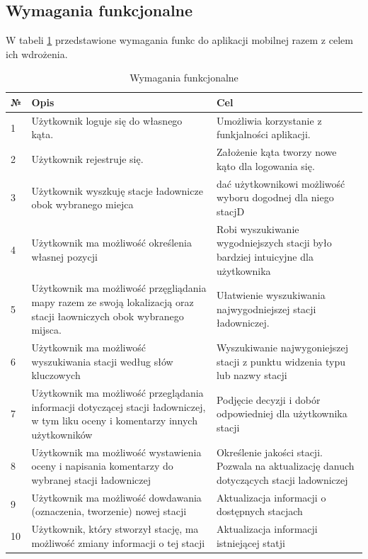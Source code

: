 \subsection{Wymagania funkcjonalne}
W tabeli \ref{tab:wymaganiafunkcjonalne} przedstawione wymagania funkc do aplikacji mobilnej razem z celem ich wdrożenia.
\begin{table}[htb] \small
    \caption{Wymagania funkcjonalne}
    \label{tab:wymaganiafunkcjonalne}
    \begin{tabular}{| m{0.5cm} | m{7cm} | m{7cm} |} 
    \hline
    № & Opis & Cel \\
    \hline
    1 & Użytkownik loguje się do własnego kąta. & Umożliwia korzystanie z funkjalności aplikacji. \\ 
    \hline
    2 & Użytkownik rejestruje się. & Założenie kąta tworzy nowe kąto dla logowania się. \\ 
    \hline
    3 & Użytkownik wyszkuję stacje ładownicze obok wybranego miejca  & dać użytkownikowi możliwość wyboru dogodnej dla niego stacjD \\
    \hline
    4 & Użytkownik ma możliwość określenia własnej pozycji & Robi wyszukiwanie wygodniejszych stacji było bardziej intuicyjne dla użytkownika  \\
    \hline
    5 & Użytkownik ma możliwość przęgliądania mapy razem ze swoją lokalizacją oraz stacji łaowniczych obok wybranego mijsca. & Ułatwienie wyszukiwania najwygodniejszej stacji ładowniczej. \\
    \hline
    6 & Użytkownik ma możliwość wyszukiwania stacji według słów kluczowych & Wyszukiwanie najwygoniejszej stacji z punktu widzenia typu lub nazwy stacji \\
    \hline
    7 & Użytkownik ma możliwość przeglądania informacji dotyczącej stacji ładowniczej, w tym liku oceny i komentarzy innych użytkowników & Podjęcie decyzji i dobór odpowiedniej dla użytkownika stacji \\
    \hline
    8 & Użytkownik ma możliwość wystawienia oceny i napisania komentarzy do wybranej stacji ładowniczej & Określenie jakości stacji. Pozwala na aktualizację danuch dotyczących stacji ladowniczej \\
    \hline
    9 & Użytkownik ma możliwość dowdawania (oznaczenia, tworzenie) nowej stacji & Aktualizacja informacji o dostępnych stacjach \\
    \hline
    10 & Użytkownik, który stworzył stację, ma możliwość zmiany informacji o tej stacji & Aktualizacja informacji istniejącej statji \\
    \hline
\end{tabular}
\end{table}
\newpage
